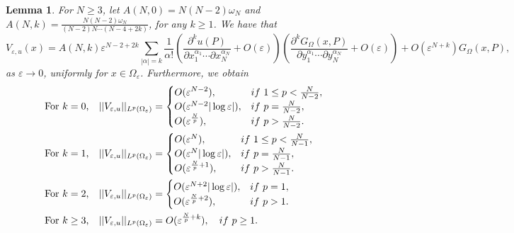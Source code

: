 \documentclass[11pt,reqno]{article}
\newtheorem{lemma}[teo]{Lemma}
\numberwithin{equation}{section}
\newcommand\e\varepsilon
\renewcommand\O\Omega
\newcommand{\Ma}{\color{blue}}
\newcommand{\Ying}{\color{red}}
\begin{document}
\begin{lemma}\label{l:improvedL2Ve}
 For $N\ge 3$, let 	$A(N,0)=N(N-2)\omega_N$ and 
			$A(N,k)=\frac{N(N-2)\omega_N}{(N-2)N\cdots(N-4+2k)}$, for any $k\ge1$. 
			We have that
				\begin{equation}\label{V1}
				\!\!\!\!\!\!\!\!\!\!\!\!V_{\e,u}(x)=A(N,k)\e^{N-2+2k}
					\sum_{|\alpha|=k}\frac1{\alpha!}
					\left(\frac{\partial^ku(P)}{\partial x_1^{\alpha_1}\cdots\partial x_N^{\alpha_N}}+O(\e)\right)
					\left(\frac{\partial^kG_{\Omega}(x,P)}{\partial y_1^{\alpha_1}\cdots\partial y_N^{\alpha_N}}+O(\e)\right)+O(\e^{N+k})G_{\Omega}(x,P),
				\end{equation}
			as $\e\to0$,	uniformly for $x\in\O_\e$.
			Furthermore, we obtain
			\begin{equation}\label{V3}
				\begin{aligned}
				&\hbox{For $k=0$,}\quad
					||V_{\e,u}||_{L^p(\O_\e)}=
					\begin{cases}
					\displaystyle	O(\e^{N-2}),  &if\ 1\le p<\frac N{N-2},\\
						O(\e^{N-2}|\log\e|), &if\  p=\frac{N}{N-2},\\
						O(\e^{\frac{N}{p}}),   &if\  p>\frac{N}{N-2}.\\
					\end{cases}\\
				&\hbox{For $k=1$,}\quad
					||V_{\e,u}||_{L^p(\O_\e)}=
					\begin{cases}
						O(\e^{N}),  &if\ 1\le p<\frac N{N-1},\\
						O(\e^{N}|\log\e|), &if\  p=\frac{N}{N-1},\\
						O(\e^{\frac{N}{p}+1}),   &if\  p>\frac{N}{N-1}.\\
					\end{cases}\\
			&	\hbox{For $k= 2$,}\quad
					||V_{\e,u}||_{L^p(\O_\e)}=
					\begin{cases}
						O(\e^{N+2}|\log\e|), &if\  p=1,\\
						O(\e^{\frac{N}{p}+2}),   &if\  p>1.\\
					\end{cases}\\
		&	\hbox{For $k\ge 3$,}\quad
					||V_{\e,u}||_{L^p(\O_\e)}=	O(\e^{\frac{N}{p}+k}),\quad if \ p\ge 1.
				\end{aligned}
			\end{equation}
		\end{lemma}
\end{document}
